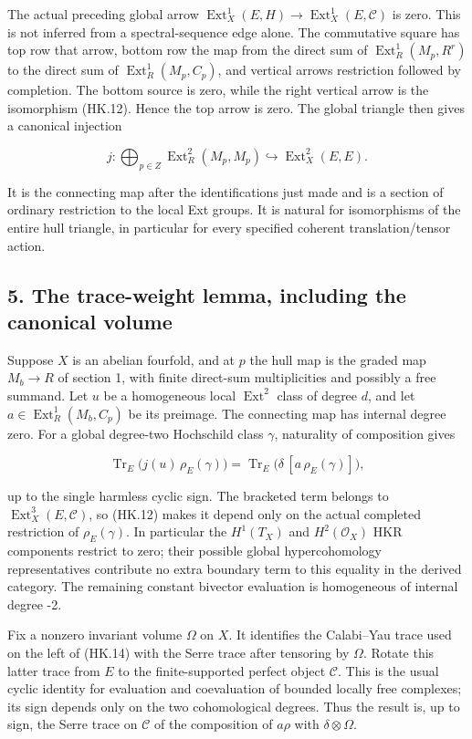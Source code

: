 The actual preceding global arrow \(\operatorname{Ext}^1_X(E,H)\to\operatorname{Ext}^1_X(E,\mathcal C)\)
is zero. This is not inferred from a spectral-sequence edge alone.
The commutative square has top row that arrow, bottom row
the map from the direct sum of \(\operatorname{Ext}^1_R(M_p,R^r)\) to the direct sum
of \(\operatorname{Ext}^1_R(M_p,C_p)\), and vertical arrows restriction followed by
completion. The bottom source is zero, while the right vertical
arrow is the isomorphism (HK.12). Hence the top arrow is zero.
The global triangle then gives
a canonical injection

\[
 j:\bigoplus_{p\in Z}\operatorname{Ext}^2_R(M_p,M_p)
       \hookrightarrow\operatorname{Ext}^2_X(E,E).
 \tag{HK.13}
\]

It is the connecting map after the identifications just made and is
a section of ordinary restriction to the local Ext groups. It is
natural for isomorphisms of the entire hull triangle, in particular
for every specified coherent translation/tensor action.

\subsection{5. The trace-weight lemma, including the canonical volume}\label{SF-E846:s5}

Suppose \(X\) is an abelian fourfold, and at \(p\) the hull map is the graded
map \(M_b\to R\) of section 1, with finite direct-sum multiplicities and
possibly a free summand. Let \(u\) be a homogeneous local \(\operatorname{Ext}^2\) class of
degree \(d\), and let \(a\in\operatorname{Ext}^1_R(M_b,C_p)\) be its preimage. The connecting
map has internal degree zero. For a global degree-two Hochschild
class \(\gamma\), naturality of composition gives

\[
 \operatorname{Tr}_E\bigl(j(u)\,\rho_E(\gamma)\bigr)
   =\operatorname{Tr}_E\bigl(\delta\,[a\,\rho_E(\gamma)]\bigr),
 \tag{HK.14}
\]

up to the single harmless cyclic sign. The bracketed term belongs
to \(\operatorname{Ext}^3_X(E,\mathcal C)\), so (HK.12) makes it depend only on the actual
completed restriction of \(\rho_E(\gamma)\). In particular the \(H^1(T_X)\)
and \(H^2(\mathcal O_X)\) HKR components restrict to zero; their possible global
hypercohomology representatives contribute no extra boundary term
to this equality in the derived category. The remaining constant
bivector evaluation is homogeneous of internal degree -2.

Fix a nonzero invariant volume \(\Omega\) on \(X\). It identifies the
Calabi--Yau trace used on the left of (HK.14) with the Serre trace
after tensoring by \(\Omega\). Rotate this latter trace from \(E\) to the
finite-supported perfect object \(\mathcal C\). This is the usual cyclic
identity for evaluation and coevaluation of bounded locally free
complexes; its sign depends only on the two cohomological degrees.
Thus the result is, up to sign, the Serre trace on \(\mathcal C\) of
the composition of \(a\rho\) with \(\delta\otimes\Omega\).

